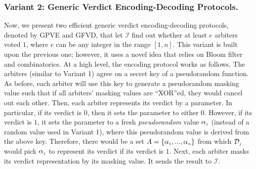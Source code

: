 \subsubsection{Variant 2: Generic Verdict  Encoding-Decoding Protocols.} Now, we present two  efficient generic verdict  encoding-decoding protocols, denoted by GPVE and GFVD,  that let $\mathcal{I}$ find out whether at least $e$ arbiters voted $1$, where $e$ can be any integer in the range $[1, n]$. This variant is  built upon the previous one; however, it uses a novel idea that relies on  Bloom filter and combinatorics.  At a high level, the encoding protocol works as follows.  The arbiters (similar to Variant 1) agree on a secret key of a pseudorandom function. As before, each arbiter will use this key to  generate a pseudorandom masking value such that if all arbiters' masking values are ``XOR''ed, they would cancel out each other. Then, each arbiter represents its verdict by a parameter. In particular, if its verdict is $0$, then  it  sets the parameter to either $0$. However, if   its verdict is $1$, it sets the parameter to a fresh \emph{pseudorandom} value $\alpha_{\scriptscriptstyle j}$ (instead of a random value used in Variant 1),  where this  pseudorandom value is derived from the above key. Therefore, there would be a set $A=\{\alpha_{\scriptscriptstyle 1},..., \alpha_{\scriptscriptstyle n}\}$ from which  $\mathcal{D}_{\scriptscriptstyle j}$ would pick $\alpha_{\scriptscriptstyle j}$ to represent its verdict if its verdict is $1$. Next, each arbiter masks its verdict representation by its masking  value. It sends the result to 
 $\mathcal{I}$.
 




